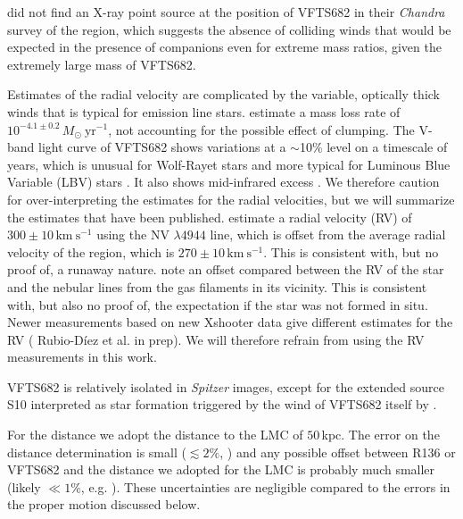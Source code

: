 \documentclass[apjl,twocolumn]{emulateapj}
\newcommand{\kms}{{\,\mathrm{km\ s^{-1}}}}
\newcommand{\Msun}{{\,\mathrm{M}_\odot}}
\begin{document}
\cite{townsley:06} did not find
an X-ray point source at the position of VFTS682 in their
\emph{Chandra} survey of the region, which suggests the absence of
colliding winds that would be expected in the presence of companions
even for extreme mass ratios, given the extremely large mass of VFTS682.

Estimates of the radial velocity are complicated by the variable,
optically thick winds that is typical for emission line
stars. \citet{bestenlehner:11} estimate a mass loss rate of
$10^{-4.1\pm0.2}\,M_\odot \ \mathrm{yr}^{-1}$, not accounting for the
possible effect of clumping.  The V-band light curve of VFTS682  shows
variations at a $\sim$10\% level on a timescale of years, which is
unusual for Wolf-Rayet stars and more typical for Luminous Blue
Variable (LBV) stars \citep{udalski:08, bestenlehner:11}. It also
shows mid-infrared excess \citep{gruendl:09}.  We therefore caution for over-interpreting the estimates for the radial velocities, but we will summarize the estimates that have been published.  \citet{bestenlehner:11}  estimate a radial velocity (RV) of  $300\pm10\kms$ using the  N{\footnotesize V} $\lambda4944$ line, which is offset from the average radial velocity of the region, which is  $270\pm10\kms$. This is consistent with, but no proof of, a runaway nature.  \cite{bressert:12} note an offset compared between the RV of the star and the nebular lines from the gas filaments in its vicinity. This is consistent with, but also no proof of, the expectation if the star was not formed in situ.  Newer measurements based on new Xshooter data give different estimates for the RV ({\color{blue} Rubio-D{\' i}ez et al. in prep}). We will therefore refrain from using the RV measurements in this work. 


VFTS682 is relatively isolated in \emph{Spitzer} images, except for the extended
source S10 interpreted as star formation triggered by the wind of
VFTS682 itself by \cite{walborn:13}. 


For the distance we adopt the distance to the LMC of $50$\,kpc. The error on the distance determination is small ($\lesssim2\%$, \citealt{pietrzynski:13}) and any possible offset between  R136 or VFTS682  and the distance we adopted for the LMC is probably much smaller (likely $\ll 1\%$, e.g. \citealt{Luks+1992}). These uncertainties are negligible compared to the errors in the proper motion discussed below.  
\end{document}
